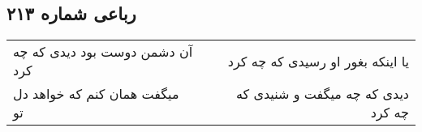 \begin{center}
\section*{رباعی شماره ۲۱۳}
\label{sec:sh213}
\begin{longtable}{l p{0.5cm} r}
آن دشمن دوست بود دیدی که چه کرد
&&
یا اینکه بغور او رسیدی که چه کرد
\\
میگفت همان کنم که خواهد دل تو
&&
دیدی که چه میگفت و شنیدی که چه کرد
\\
\end{longtable}
\end{center}
